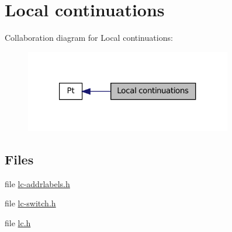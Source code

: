 \hypertarget{group__lc}{
\section{Local continuations}
\label{group__lc}
}


Collaboration diagram for Local continuations:
\nopagebreak
\begin{figure}[H]
\begin{center}
\leavevmode
\includegraphics[width=256pt]{group__lc}
\end{center}
\end{figure}


\subsection*{Files}
\begin{DoxyCompactItemize}
\item 
file \hyperlink{lc-addrlabels_8h}{lc-\/addrlabels.h}
\item 
file \hyperlink{lc-switch_8h}{lc-\/switch.h}
\item 
file \hyperlink{lc_8h}{lc.h}
\end{DoxyCompactItemize}
